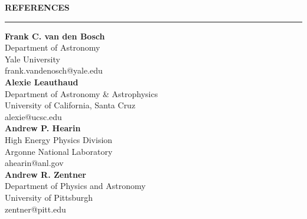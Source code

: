 \documentclass[12pt,letterpaper]{article}
\renewenvironment{section}[1]
  {
  \medskip
  {\color{blue} \MakeUppercase{\bf #1}}
  \smallskip
  \hrule
  \medskip
  \begin{adjustwidth}{0.3cm}{}
  }
  {
  \end{adjustwidth}
  }
\newcommand{\entry}[3]{{\bf #1} \hfill {#2} \\ {#3}}
\begin{document}
\begin{section}{References}
    \entry{Frank C. van den Bosch}{}{Department of Astronomy\\Yale University\\frank.vandenosch@yale.edu} \medskip \\
    \entry{Alexie Leauthaud}{}{Department of Astronomy \& Astrophysics\\University of California, Santa Cruz\\alexie@ucsc.edu} \medskip \\
    \entry{Andrew P. Hearin}{}{High Energy Physics Division\\Argonne National Laboratory\\ahearin@anl.gov} \medskip \\
    \entry{Andrew R. Zentner}{}{Department of Physics and Astronomy\\University of Pittsburgh\\zentner@pitt.edu}
\end{section}
\end{document}
